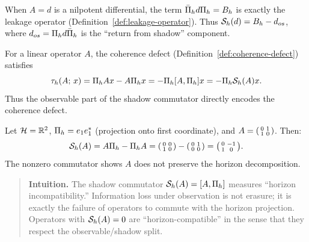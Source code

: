 \begin{remark}
When $A = d$ is a nilpotent differential, the term $\CCPibar{h} d \CCPi{h} = \CCLeak{d}{h}$ is exactly the leakage operator (Definition~\ref{def:leakage-operator}).
Thus $\CCShadowComm{d}{h} = \CCLeak{d}{h} - d_{os}$, where $d_{os} = \CCPi{h} d \CCPibar{h}$ is the ``return from shadow'' component.
\end{remark}

\begin{remark}
For a linear operator $A$, the coherence defect (Definition~\ref{def:coherence-defect}) satisfies
\[
\CCTau{h}{A}{x} = \CCPi{h} A x - A \CCPi{h} x = -\CCPi{h} [A, \CCPi{h}] x = -\CCPi{h} \CCShadowComm{A}{h} x.
\]
Thus the observable part of the shadow commutator directly encodes the coherence defect.
\end{remark}

\begin{example}
\label{ex:shadow-commutator}
Let $\cH = \bbR^2$, $\CCPi{h} = e_1 e_1^*$ (projection onto first coordinate), and $A = \begin{psmallmatrix} 0 & 1 \\ 1 & 0 \end{psmallmatrix}$.
Then:
\[
\CCShadowComm{A}{h} = A \CCPi{h} - \CCPi{h} A = \begin{psmallmatrix} 0 & 0 \\ 1 & 0 \end{psmallmatrix} - \begin{psmallmatrix} 0 & 1 \\ 0 & 0 \end{psmallmatrix} = \begin{psmallmatrix} 0 & -1 \\ 1 & 0 \end{psmallmatrix}.
\]
The nonzero commutator shows $A$ does not preserve the horizon decomposition.
\end{example}

\begin{quote}\small
\textbf{Intuition.}
The shadow commutator $\CCShadowComm{A}{h} = [A, \CCPi{h}]$ measures ``horizon incompatibility.''
Information loss under observation is not erasure; it is exactly the failure of operators to commute with the horizon projection.
Operators with $\CCShadowComm{A}{h} = 0$ are ``horizon-compatible'' in the
sense that they respect the observable/shadow split.
\end{quote}

